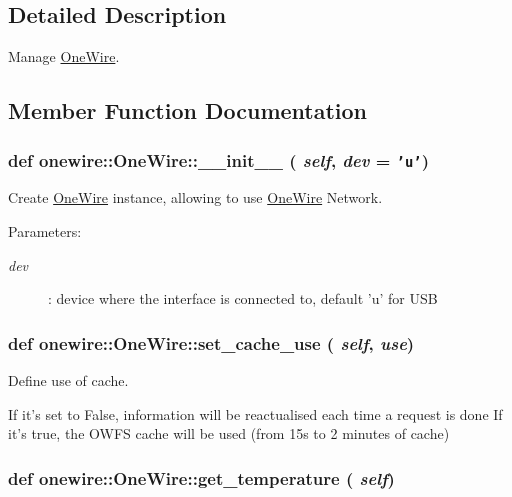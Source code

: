 \subsection{Detailed Description}
Manage \hyperlink{classonewire_1_1OneWire}{OneWire}. 

\subsection{Member Function Documentation}
\hypertarget{classonewire_1_1OneWire_effc317af881a97edf6d7dd77c63b88c}{
\subsubsection[\_\-\_\-init\_\-\_\-]{\setlength{\rightskip}{0pt plus 5cm}def onewire::OneWire::\_\-\_\-init\_\-\_\- ( {\em self}, \/   {\em dev} = {\tt 'u'})}}
\label{classonewire_1_1OneWire_effc317af881a97edf6d7dd77c63b88c}


Create \hyperlink{classonewire_1_1OneWire}{OneWire} instance, allowing to use \hyperlink{classonewire_1_1OneWire}{OneWire} Network. 

\begin{Desc}
\item[Parameters:]
\begin{description}
\item[{\em dev}]: device where the interface is connected to, default 'u' for USB \end{description}
\end{Desc}
\hypertarget{classonewire_1_1OneWire_41228b6b8c1562f02d0b40c8e40d96b4}{
\subsubsection[set\_\-cache\_\-use]{\setlength{\rightskip}{0pt plus 5cm}def onewire::OneWire::set\_\-cache\_\-use ( {\em self}, \/   {\em use})}}
\label{classonewire_1_1OneWire_41228b6b8c1562f02d0b40c8e40d96b4}


Define use of cache. 

If it's set to False, information will be reactualised each time a request is done If it's true, the OWFS cache will be used (from 15s to 2 minutes of cache) \hypertarget{classonewire_1_1OneWire_ece120e9964b38335bf23a7028d45083}{
\subsubsection[get\_\-temperature]{\setlength{\rightskip}{0pt plus 5cm}def onewire::OneWire::get\_\-temperature ( {\em self})}}
\label{classonewire_1_1OneWire_ece120e9964b38335bf23a7028d45083}


